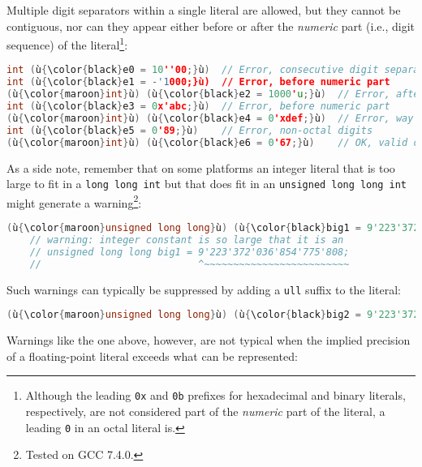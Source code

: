 \noindent Multiple digit separators within a single literal are allowed, but they
cannot be contiguous, nor can they appear either before or after the
\emph{numeric} part (i.e., digit sequence) of the
literal{\cprotect\footnote{Although the leading \lstinline!0x! and
\lstinline!0b! prefixes for hexadecimal and binary literals,
respectively, are not considered part of the \emph{numeric} part of
  the literal, a leading \lstinline!0! in an octal literal is.}}:

\begin{lstlisting}[language=C++]
int (ù{\color{black}e0 = 10''00;}ù)  // Error, consecutive digit separators
int (ù{\color{black}e1 = -'1000;}ù)  // Error, before numeric part
(ù{\color{maroon}int}ù) (ù{\color{black}e2 = 1000'u;}ù)  // Error, after numeric part
int (ù{\color{black}e3 = 0x'abc;}ù)  // Error, before numeric part
(ù{\color{maroon}int}ù) (ù{\color{black}e4 = 0'xdef;}ù)  // Error, way before numeric part
int (ù{\color{black}e5 = 0'89;}ù)    // Error, non-octal digits
(ù{\color{maroon}int}ù) (ù{\color{black}e6 = 0'67;}ù)    // OK, valid octal literal
\end{lstlisting}

\noindent As a side note, remember that on some platforms an integer literal
that is too large to fit in a \lstinline!long!~\lstinline!long!~\lstinline!int! but that does fit in an
\lstinline!unsigned!~\lstinline!long!~\lstinline!long!~\lstinline!int! might
generate a warning{\cprotect\footnote{Tested on GCC 7.4.0.}}:

\begin{lstlisting}[language=C++]
(ù{\color{maroon}unsigned long long}ù) (ù{\color{black}big1 = 9'223'372'036'854'775'808;}ù)  // (ù{\codeincomments{2\^{}63}}ù)
    // warning: integer constant is so large that it is an
    // unsigned long long big1 = 9'223'372'036'854'775'808;
    //                           ^~~~~~~~~~~~~~~~~~~~~~~~~~
\end{lstlisting}

\noindent Such warnings can typically be suppressed by adding a \lstinline!ull!
suffix to the literal:

\begin{lstlisting}[language=C++]
(ù{\color{maroon}unsigned long long}ù) (ù{\color{black}big2 = 9'223'372'036'854'775'808ull;}ù)  // OK
\end{lstlisting}

\noindent Warnings like the one above, however, are not typical when the implied
precision of a floating-point literal exceeds what can be represented:

